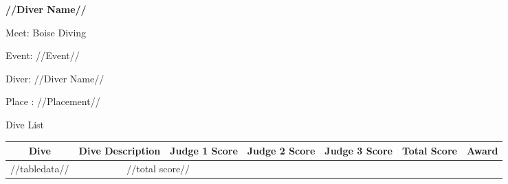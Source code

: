\documentclass[12pt, letterpaper, landscape]{article}
\begin{document}
	\begin{center}
		\textbf{//Diver Name//}
	\end{center}
	
	Meet: Boise Diving

	Event: //Event//
	
	Diver: //Diver Name//
	
	Place : //Placement//
	
	\begin{center}
		Dive List
	\end{center}
	
	\begin{table}[h]
		\centering
			\begin{tabularx}{\textwidth}{|c X X X X X X|}
			Dive&Dive Description&Judge 1 Score&Judge 2 Score&Judge 3 Score&Total Score & Award\\\midrule
			//tabledata//\midrule
			\multicolumn{5}{|c}{Total} & \multicolumn{2}{c|}{//total score//}\\
		\end{tabularx}
	\end{table}
\end{document}
